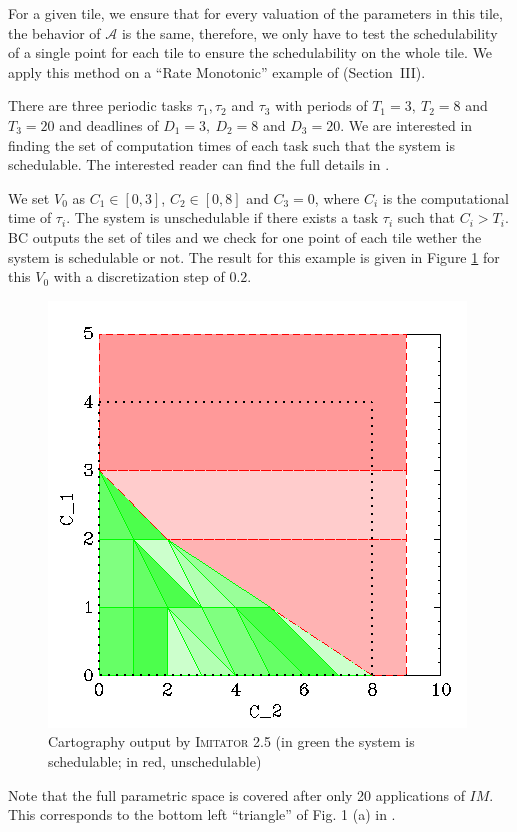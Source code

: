 \documentclass{llncs}
\newcommand{\A}{\mathcal{A}}
\newcommand{\IM}{\mathit{IM}}
\newcommand{\imitator}{\textsc{Imitator}}
\begin{document}
For a given tile, we ensure that for every valuation of the parameters in this tile, the behavior of $\A$ is the same, therefore, we only
have to test the schedulability of a single point for each tile to ensure the schedulability on the whole tile. We apply this method on a ``Rate Monotonic''
 example of \cite{bb04} (Section~III).

There are three periodic tasks $\tau_1, \tau_2$ and $\tau_3$ with periods of $T_1 = 3, \ T_2 = 8$ and $T_3 = 20$ and deadlines of $D_1 = 3, \ D_2 = 8$ and $D_3 = 20$. We are interested in finding the set
 of computation times of each task such that the system is schedulable. The interested reader can find the full details in \cite{bb04}.

We set $V_0$ as $C_1 \in [0,3]$, $C_2 \in [0,8]$ and $C_3 = 0$, where $C_i$ is the computational time of $\tau_i$. The system is unschedulable if there exists a task $\tau_i$ such that $C_i > T_i$. 
BC outputs the set of tiles and we check for one point of each tile wether the system is schedulable or not.
The result for this example is given in Figure \ref{fig:carto} for this $V_0$ with a discretization step of $0.2$.

\begin{figure}[!ht]
 \centering
 \includegraphics[scale = 0.5]{./figures/C1-C2.png}
 \caption{Cartography output by \imitator{} 2.5 (in green the system is schedulable; in red, unschedulable)}
 \label{fig:carto}
\end{figure}
Note that the full parametric space is covered after only 20 applications of $\IM$. This corresponds to the bottom left ``triangle'' of Fig. 1 (a) in \cite{bb04}.
\end{document}

